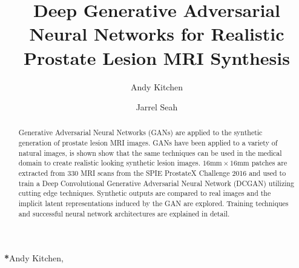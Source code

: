 \documentclass[a4paper,12pt]{spieman}  %
\title{Deep Generative Adversarial Neural Networks for Realistic Prostate Lesion MRI Synthesis}
\author[a]{Andy Kitchen}
\author[b]{Jarrel Seah}
\affil[a,*]{Independent Researcher}
\affil[b]{STAT Innovations Pty. Ltd., PO Box 274, Ashburton VIC 3147, Australia}
\begin{document}
 
\maketitle

\begin{abstract}

	Generative Adversarial Neural Networks (GANs) are applied to the
	synthetic generation of prostate lesion MRI images. GANs have been
	applied to a variety of natural images, is shown show that the same
	techniques can be used in the medical domain to create realistic
	looking synthetic lesion images. $16\text{mm} \times 16\text{mm}$
	patches are extracted from 330 MRI scans from the SPIE ProstateX
	Challenge 2016 and used to train a Deep Convolutional Generative
	Adversarial Neural Network (DCGAN) utilizing cutting edge techniques.
	Synthetic outputs are compared to real images and the implicit latent
	representations induced by the GAN are explored. Training techniques
	and successful neural network architectures are explained in detail.

\end{abstract}


{\noindent \footnotesize\textbf{*}Andy Kitchen,
	 }
\end{document}
